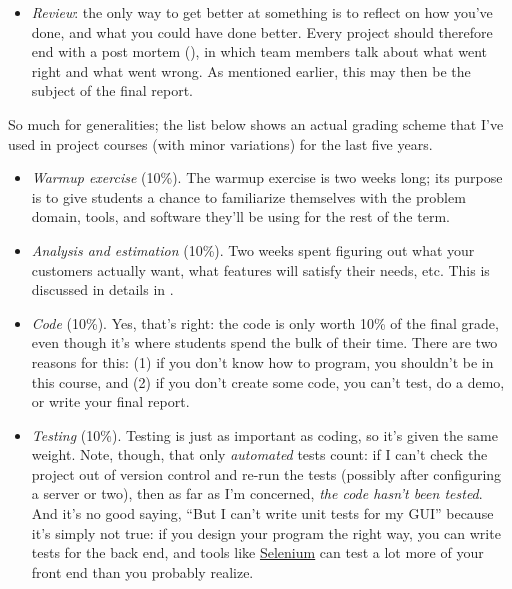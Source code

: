 \documentclass{report}
\begin{document}
\begin{itemize}
  \item \emph{Review}: the only way to get better at something is to
  reflect on how you've done, and what you could have done better.
  Every project should therefore end with a post mortem
  (), in which team members talk about
  what went right and what went wrong.  As mentioned earlier, this may
  then be the subject of the final report.

\end{itemize}

So much for generalities; the list below shows an actual grading
scheme that I've used in project courses (with minor variations) for
the last five years.

\begin{itemize}

  \item \emph{Warmup exercise} (10\%).  The warmup exercise is two
  weeks long; its purpose is to give students a chance to familiarize
  themselves with the problem domain, tools, and software they'll be
  using for the rest of the term.

  \item \emph{Analysis and estimation} (10\%).  Two weeks spent
  figuring out what your customers actually want, what features will
  satisfy their needs, etc.  This is discussed in details in
  .

  \item \emph{Code} (10\%).  Yes, that's right: the code is only worth
  10\% of the final grade, even though it's where students spend the
  bulk of their time.  There are two reasons for this: (1) if you
  don't know how to program, you shouldn't be in this course, and (2)
  if you don't create some code, you can't test, do a demo, or write
  your final report.

  \item \emph{Testing} (10\%).  Testing is just as important as
  coding, so it's given the same weight. Note, though, that only
  \emph{automated} tests count: if I can't check the project out of
  version control and re-run the tests (possibly after configuring a
  server or two), then as far as I'm concerned, \emph{the code hasn't
  been tested}.  And it's no good saying, ``But I can't write unit
  tests for my GUI'' because it's simply not true: if you design your
  program the right way, you can write tests for the back end, and
  tools like \url{Selenium} can test a lot more of your front end than
  you probably realize.


\end{itemize}
\end{document}
